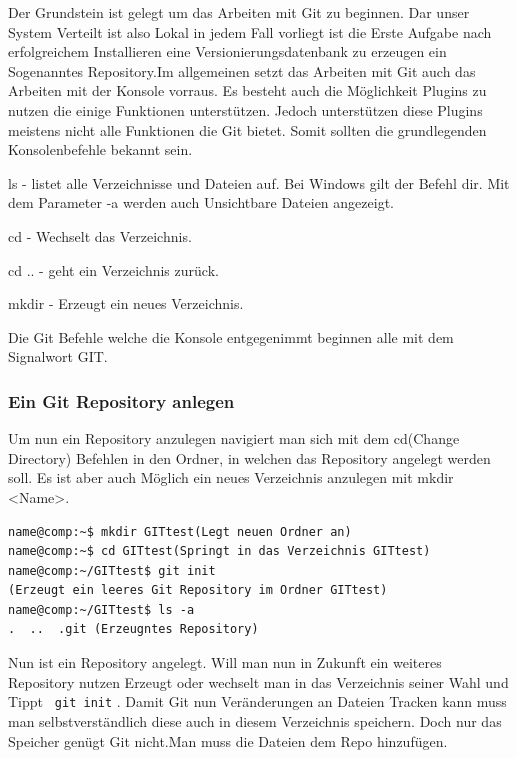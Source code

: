 \documentclass[12pt,a4paper,bibliography=totocnumbered,listof=totocnumbered]{scrartcl}
\begin{document}
Der Grundstein ist gelegt um das Arbeiten mit Git zu beginnen. Dar unser System Verteilt ist also Lokal in jedem Fall vorliegt ist die Erste Aufgabe nach erfolgreichem Installieren eine Versionierungsdatenbank zu erzeugen ein Sogenanntes Repository.Im allgemeinen setzt das Arbeiten mit Git auch das Arbeiten mit der Konsole vorraus. Es besteht auch die Möglichkeit Plugins zu nutzen die einige Funktionen unterstützen. Jedoch unterstützen diese Plugins meistens nicht alle Funktionen die Git bietet. Somit sollten die grundlegenden Konsolenbefehle bekannt sein.  
\begin{compactitem}
	\item ls - listet alle Verzeichnisse und Dateien 	auf. Bei Windows gilt der Befehl dir. Mit dem Parameter -a werden auch Unsichtbare Dateien angezeigt. 
	\item cd - Wechselt das Verzeichnis.
	\item cd .. - geht ein Verzeichnis zurück.
	\item mkdir - Erzeugt ein neues Verzeichnis. 
\end{compactitem}
Die Git Befehle welche die Konsole entgegenimmt beginnen alle mit dem Signalwort GIT.  
\newpage 
\subsubsection{Ein Git Repository anlegen}
Um nun ein Repository anzulegen navigiert man sich mit dem cd(Change Directory) Befehlen in den Ordner, in welchen das Repository angelegt werden soll. Es ist aber auch Möglich ein neues Verzeichnis anzulegen mit mkdir <Name>. 

  \vspace{1em}
\begin{lstlisting}[caption=Git Repository anlegen, label=lst:arduino]
name@comp:~$ mkdir GITtest(Legt neuen Ordner an)
name@comp:~$ cd GITtest(Springt in das Verzeichnis GITtest)
name@comp:~/GITtest$ git init 
(Erzeugt ein leeres Git Repository im Ordner GITtest)
name@comp:~/GITtest$ ls -a
.  ..  .git (Erzeugntes Repository)

\end{lstlisting}

Nun ist ein Repository angelegt.
Will man nun in Zukunft ein weiteres Repository nutzen Erzeugt oder wechselt man in das Verzeichnis seiner Wahl und Tippt  \lstinline| git init| . Damit Git nun Veränderungen an Dateien Tracken kann muss man selbstverständlich diese auch in diesem Verzeichnis speichern. Doch nur das Speicher genügt Git nicht.Man muss die Dateien dem Repo hinzufügen. 
\end{document}
